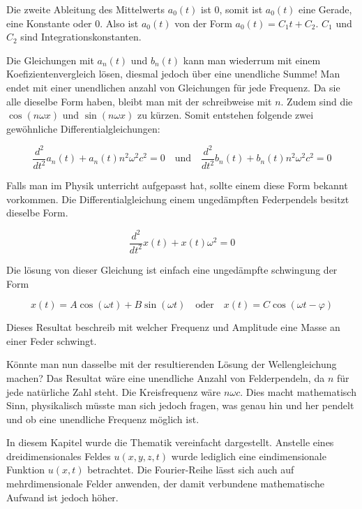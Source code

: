 Die zweite Ableitung des Mittelwerts $a_0(t)$ ist 0, somit ist $a_0(t)$ eine Gerade, eine Konstante oder 0. Also ist $a_0(t)$ von der Form $a_0(t)=C_1 t + C_2$. 
$C_1$ und $C_2$ sind Integrationskonstanten.



Die Gleichungen mit $a_n(t)$ und $b_n(t)$ kann man wiederrum mit einem Koefizientenvergleich lösen, diesmal jedoch über eine unendliche Summe! Man endet mit einer unendlichen anzahl von Gleichungen für jede Frequenz. Da sie alle dieselbe Form haben, bleibt man mit der schreibweise mit $n$.
Zudem sind die $\cos(n\omega x)$ und $\sin(n\omega x)$ zu kürzen. 
Somit entstehen folgende zwei gewöhnliche Differentialgleichungen:

\begin{equation}
	\frac{d^2}{dt^2} a_n(t) + a_n(t) n^2 \omega^2 c^2 = 0
	  \quad   \text{und} \quad  \frac{d^2}{dt^2} b_n(t) + b_n(t) n^2 \omega^2 c^2 = 0
\end{equation}

Falls man im Physik unterricht aufgepasst hat, sollte einem diese Form bekannt vorkommen. Die Differentialgleichung einem ungedämpften Federpendels besitzt dieselbe Form. 

\begin{equation}
	\frac{d^2}{dt^2} x(t) + x(t) \omega^2  = 0
\end{equation}

Die lösung von dieser Gleichung ist einfach eine ungedämpfte schwingung der Form 

\begin{equation}
x(t) = A \cos(\omega t) + B \sin(\omega t) \quad \text{oder} \quad x(t) = C \cos(\omega t - \varphi)
\end{equation}

Dieses Resultat beschreib mit welcher Frequenz und Amplitude eine Masse an einer Feder schwingt. 

Könnte man nun dasselbe mit der resultierenden Lösung der Wellengleichung machen?
Das Resultat wäre eine unendliche Anzahl von Felderpendeln, da $n$ für jede natürliche Zahl steht. 
Die Kreisfrequenz wäre  $n \omega c$. 
Dies macht mathematisch Sinn, physikalisch müsste man sich jedoch fragen, was genau hin und her pendelt und ob eine unendliche Frequenz möglich ist.



In diesem Kapitel wurde die Thematik vereinfacht dargestellt. 
Anstelle eines dreidimensionales Feldes $u(x,y,z,t)$ wurde lediglich eine eindimensionale Funktion $u(x,t)$ betrachtet. Die Fourier-Reihe lässt sich auch auf mehrdimensionale Felder anwenden, der damit verbundene mathematische Aufwand ist jedoch höher. 








